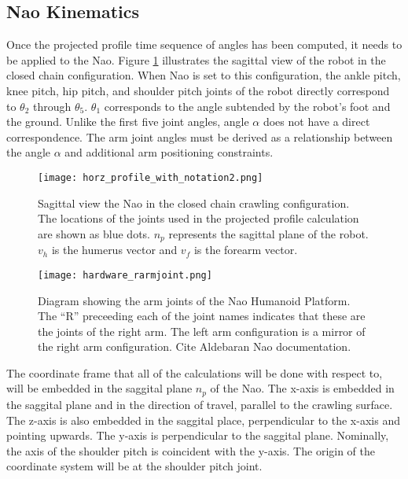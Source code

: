 \subsection{Nao Kinematics} \label{subsec:nao_kinematics}
Once the projected profile time sequence of angles has been computed, it needs to be applied to the Nao.
Figure \ref{fig:nao_pp_view1} illustrates the sagittal view of the robot in the closed chain configuration.
When Nao is set to this configuration, the ankle pitch, knee pitch, hip pitch, and shoulder pitch joints 
of the robot directly correspond to $\theta_2$ through $\theta_5$. $\theta_1$ corresponds to the angle
subtended by the robot's foot and the ground. Unlike the first five joint angles, angle $\alpha$ does not have a
direct correspondence. The arm joint angles must be derived as a relationship between the angle $\alpha$ and additional
arm positioning constraints.

\begin{figure}
	\texttt{[image: horz\_profile\_with\_notation2.png]}
  	\caption{Sagittal view the Nao in the closed chain crawling configuration. 
  					 The locations of the joints used in the projected profile calculation are shown as blue dots. 
  					 $n_p$ represents the sagittal plane of the robot.
  					 $v_h$ is the humerus vector and $v_f$ is the forearm vector.
  					}
  	\label{fig:nao_pp_view1}
\end{figure}

\begin{figure}
	\texttt{[image: hardware\_rarmjoint.png]}
  	\caption{Diagram showing the arm joints of the Nao Humanoid Platform.
  					 The ``R'' preceeding each of the joint names indicates that these
  					 are the joints of the right arm. The left arm configuration is a mirror
  					 of the right arm configuration. Cite Aldebaran Nao documentation.
  				  }
  	\label{fig:nao_rarm_hardware1}
\end{figure}

The coordinate frame that all of the calculations will be done with respect to, will be embedded in the
saggital plane $n_p$ of the Nao. The x-axis is embedded in the saggital plane and in the direction of travel, parallel to the crawling surface. The z-axis is also embedded in the saggital place, perpendicular to the x-axis
and pointing upwards.
The y-axis is perpendicular to the saggital plane. Nominally, the axis of the shoulder pitch is coincident
with the y-axis. The origin of the coordinate system will be at the shoulder pitch joint.

